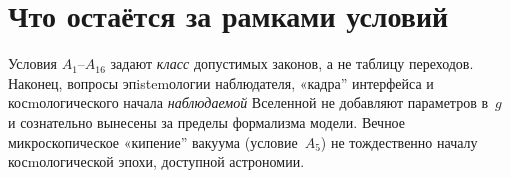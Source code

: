 \section{Что остаётся за рамками условий}

Условия $A_1$--$A_{16}$ задают \emph{класс} допустимых законов, а не таблицу переходов.
Наконец, вопросы эпistemологии наблюдателя, «кадра'' интерфейса и косmологического
начала \emph{наблюдаемой} Вселенной не добавляют параметров в~$g$
и сознательно вынесены за пределы формализма модели.
Вечное микроскопическое «кипение'' вакуума (условие~$A_5$) не тождественно
началу косmологической эпохи, доступной астрономии.


